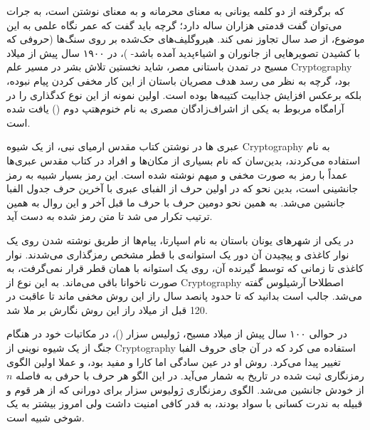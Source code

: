 \documentclass[10pt]{report}
\begin{document}
\begin{presNote}
که برگرفته از دو کلمه یونانی 
به معنای محرمانه و 
به معنای نوشتن است، به جرات می‌توان گفت قدمتی هزاران ساله دارد؛ گرچه باید گفت که عمر نگاه علمی به این موضوع، از صد سال تجاوز نمی کند. هیروگلیف‌های حک‌شده بر روی سنگ‌ها‌ (حروفی که با کشیدن تصویرهایی از جانوران و اشیاءپدید آمده باشد-
)،
در ۱۹۰۰ سال پیش از میلاد مسیح در تمدن باستانی مصر، شاید نخستین تلاش بشر در مسیر علم 
\gls{Cryptography}
بود، گرچه به نظر می رسد هدف مصریان باستان از این کار مخفی کردن پیام نبوده، بلکه برعکس افزایش جذابیت کتیبه‌ها بوده است. اولین نمونه از این نوع کدگذاری را در آرامگاه مربوط به یکی از اشراف‌زادگان مصری به نام خنوم‌هتپ دوم 
()
یافت شده است.

عبری ها در نوشتن کتاب مقدس ارمیای نبی، از یک شیوه 
\gls{Cryptography} به نام 
استفاده می‌کردند، بدین‌سان که نام بسیاری از مکان‌ها و افراد در کتاب مقدس عبری‌ها عمداً با رمز  به صورت مخفی و مبهم نوشته شده است. این رمز بسیار شبیه به رمز جانشینی است، بدین نحو که در  اولین حرف از الفبای عبری با آخرین حرف جدول الفبا جانشین می‌شد. به همین نحو دومین حرف با حرف ما قبل آخر و این روال به همین ترتیب تکرار می شد تا متن رمز شده به دست آید.

در یکی از شهرهای یونان باستان به نام اسپارتا، پیام‌ها از طریق نوشته شدن روی یک نوار کاغذی و پیچیدن آن دور یک استوانه‌ی با قطر مشخص رمزگذاری ‌می‌شدند. نوار کاغذی تا زمانی که توسط گیرنده آن، روی یک استوانه با همان قطر قرار نمی‌گرفت، به صورت ناخوانا باقی می‌ماند. به این نوع از
\gls{Cryptography}
اصطلاحا آرشیلوس گفته می‌شد. جالب است بدانید که تا حدود پانصد سال راز این روش مخفی ماند تا عاقبت در 120 قبل از میلاد راز این روش نگارش بر ملا شد.


در حوالی ۱۰۰ سال پیش از میلاد مسیح، ژولیس سزار 
()،
در مکاتبات خود در هنگام جنگ از یک شیوه نوینی از 
\gls{Cryptography}
استفاده می کرد که در آن جای حروف الفبا تغییر پیدا می‌کرد. روش او در عین سادگی اما کارا و مفید بود، و عملا اولین الگوی رمزنگاری
ثبت شده در تاریخ به شمار می‌آید. در این الگو هر حرف با حرفی به فاصله $n$ از خودش جانشین می‌شد. الگوی رمزنگاری ژولیوس سزار برای دورانی که از هر قوم و قبیله به ندرت کسانی با سواد بودند، به قدر کافی امنیت داشت ولی امروز بیشتر به یک شوخی شبیه است. 
\end{presNote}


\printabbreviation
\printglossary
\end{document}

